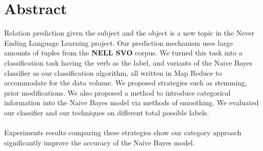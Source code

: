 \section*{Abstract}

Relation prediction given the subject and the object is a new topic in the Never Ending Language Learning project. Our prediction mechanism uses large amounts of tuples from the \textbf{NELL SVO} corpus. We turned this task into a classification task having the verb as the label, and variants of the Naive Bayes classifier as our classification algorithm, all written in Map Reduce to accommodate for the data volume. We proposed strategies such as stemming, prior modifications. We also proposed a method to introduce categorical information into the Naive Bayes model via methods of smoothing. We evaluated our classifier and our techniques on different total possible labels.\\
\\
Experiments results comparing these strategies show our category approach significantly improve the accuracy of the Naive Bayes model.

